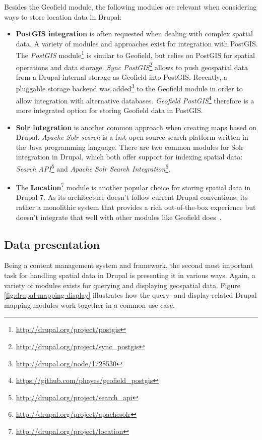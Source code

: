 Besides the Geofield module, the following modules are relevant when considering ways to store location data in Drupal: 

\begin{itemize}

\item \textbf{PostGIS integration} is often requested when dealing with complex spatial data. A variety of modules and approaches exist for integration with PostGIS. The \textit{PostGIS} module\footnote{\url{http://drupal.org/project/postgis}} is similar to Geofield, but relies on PostGIS for spatial operations and data storage. \textit{Sync PostGIS}\footnote{\url{http://drupal.org/project/sync_postgis}} allows to push geospatial data from a Drupal-internal storage as Geofield into PostGIS. Recently, a pluggable storage backend was added\footnote{\url{http://drupal.org/node/1728530}} to the Geofield module in order to allow integration with alternative databases. \textit{Geofield PostGIS}\footnote{\url{https://github.com/phayes/geofield_postgis}} therefore is a more integrated option for storing Geofield data in PostGIS.

\item \textbf{Solr integration} is another common approach when creating maps based on Drupal. \textit{Apache Solr search} is a fast open source search platform written in the Java programming language. There are two common modules for Solr integration in Drupal, which both offer support for indexing spatial data: \textit{Search API}\footnote{\url{http://drupal.org/project/search_api}} and \textit{Apache Solr Search Integration}\footnote{\url{http://drupal.org/project/apachesolr}}.

\item The \textbf{Location}\footnote{\url{http://drupal.org/project/location}} module is another popular choice for storing spatial data in Drupal 7. As its architecture doesn't follow current Drupal conventions, its rather a monolithic system that provides a rich out-of-the-box experience but doesn't integrate that well with other modules like Geofield does~\cite{Zzolo11mappingdrupal}.

\end{itemize}

\subsection{Data presentation}

Being a content management system and framework, the second most important task for handling spatial data in Drupal is presenting it in various ways. Again, a variety of modules exists for querying and displaying geospatial data. Figure \ref{fig:drupal-mapping-display} illustrates how the query- and display-related Drupal mapping modules work together in a common use case.

